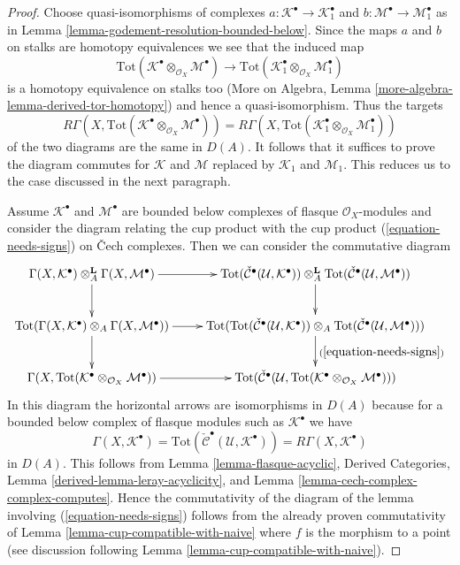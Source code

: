 \documentclass[10pt,a4paper]{amsart}
\theoremstyle{plain}
\theoremstyle{definition}
\theoremstyle{remark}
\numberwithin{equation}{subsection}
\begin{document}
\begin{proof}
Choose quasi-isomorphisms of complexes
$a : \mathcal{K}^\bullet \to \mathcal{K}_1^\bullet$ and
$b : \mathcal{M}^\bullet \to \mathcal{M}_1^\bullet$
as in Lemma \ref{lemma-godement-resolution-bounded-below}.
Since the maps $a$ and $b$ on stalks are homotopy equivalences
we see that the induced map
$$
\text{Tot}(\mathcal{K}^\bullet \otimes_{\mathcal{O}_X} \mathcal{M}^\bullet)
\to
\text{Tot}(\mathcal{K}_1^\bullet \otimes_{\mathcal{O}_X} \mathcal{M}_1^\bullet)
$$
is a homotopy equivalence on stalks too (More on Algebra, Lemma
\ref{more-algebra-lemma-derived-tor-homotopy}) and hence a quasi-isomorphism.
Thus the targets
$$
R\Gamma(X,
\text{Tot}(\mathcal{K}^\bullet
\otimes_{\mathcal{O}_X} \mathcal{M}^\bullet)) =
R\Gamma(X,
\text{Tot}(\mathcal{K}_1^\bullet
\otimes_{\mathcal{O}_X} \mathcal{M}_1^\bullet))
$$
of the two diagrams are the same in $D(A)$. It follows that it suffices
to prove the diagram commutes for $\mathcal{K}$ and $\mathcal{M}$
replaced by $\mathcal{K}_1$ and $\mathcal{M}_1$. This reduces us to
the case discussed in the next paragraph.

\medskip\noindent
Assume $\mathcal{K}^\bullet$ and $\mathcal{M}^\bullet$ are bounded
below complexes of flasque $\mathcal{O}_X$-modules and
consider the diagram relating the cup product with the cup product
(\ref{equation-needs-signs}) on {\v C}ech complexes.
Then we can consider the commutative diagram
$$
\xymatrix{
\Gamma(X, \mathcal{K}^\bullet)
\otimes_A^\mathbf{L}
\Gamma(X, \mathcal{M}^\bullet) \ar[d] \ar[r] &
\text{Tot}(\check{\mathcal{C}}^\bullet(\mathcal{U}, \mathcal{K}^\bullet))
\otimes_A^\mathbf{L}
\text{Tot}(\check{\mathcal{C}}^\bullet(\mathcal{U}, \mathcal{M}^\bullet))
\ar[d] \\
\text{Tot}(\Gamma(X, \mathcal{K}^\bullet)
\otimes_A
\Gamma(X, \mathcal{M}^\bullet)) \ar[d] \ar[r] &
\text{Tot}(
\text{Tot}(\check{\mathcal{C}}^\bullet(\mathcal{U}, \mathcal{K}^\bullet))
\otimes_A
\text{Tot}(\check{\mathcal{C}}^\bullet(\mathcal{U}, \mathcal{M}^\bullet)))
\ar[d]^{(\ref{equation-needs-signs})} \\
\Gamma(X, \text{Tot}(\mathcal{K}^\bullet
\otimes_{\mathcal{O}_X}
\mathcal{M}^\bullet)) \ar[r] &
\text{Tot}(
\check{\mathcal{C}}^\bullet({\mathcal U},
\text{Tot}(\mathcal{K}^\bullet \otimes_{\mathcal{O}_X} \mathcal{M}^\bullet)
))
}
$$
In this diagram the horizontal arrows are isomorphisms in $D(A)$ because
for a bounded below complex of flasque modules such as $\mathcal{K}^\bullet$
we have
$$
\Gamma(X, \mathcal{K}^\bullet) =
\text{Tot}(\check{\mathcal{C}}^\bullet(\mathcal{U}, \mathcal{K}^\bullet)) =
R\Gamma(X, \mathcal{K}^\bullet)
$$
in $D(A)$. This follows from
Lemma \ref{lemma-flasque-acyclic},
Derived Categories, Lemma \ref{derived-lemma-leray-acyclicity}, and
Lemma \ref{lemma-cech-complex-complex-computes}.
Hence the commutativity of the diagram of the lemma involving
(\ref{equation-needs-signs}) follows from the already proven
commutativity of Lemma \ref{lemma-cup-compatible-with-naive}
where $f$ is the morphism to a point (see discussion
following Lemma \ref{lemma-cup-compatible-with-naive}).
\end{proof}
\end{document}
